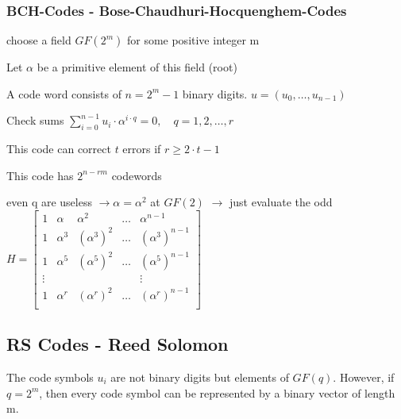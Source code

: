 \subsubsection{BCH-Codes - Bose-Chaudhuri-Hocquenghem-Codes}
\begin{liste}
  \item choose a field $GF(2^m)$ for some positive integer m
  \item Let $\alpha$ be a primitive element of this field (root)
  \item A code word consists of $n=2^m-1$ binary digits. $u=(u_0, \ldots, u_{n-1})$
  \item Check sums $\displaystyle\sum_{i=0}^{n-1} u_i \cdot \alpha^{i \cdot q} = 0, \quad q=1,2,\ldots,r$
  \item This code can correct $t$ errors if $r \geq 2\cdot t-1$
  \item This code has $2^{n-rm}$ codewords
  \item even q are useless $\to \alpha=\alpha^2$ at $GF(2)$ $\to$ just evaluate the odd\\
     			$H=\begin{bmatrix} 	1 & \alpha   & \alpha^2     	& \ldots	& \alpha^{n-1} \\    		
   						   		1 & \alpha^3 & (\alpha^3)^2	& \ldots	& (\alpha^3)^{n-1}  \\    
   						   		1 & \alpha^5 & (\alpha^5)^2	& \ldots	& (\alpha^5)^{n-1}  \\   
   						   		\vdots	&	 &					&			& \vdots \\   						 
   						   		1 & \alpha^r & (\alpha^r)^2	& \ldots	& (\alpha^r)^{n-1}  \\   		
   			\end{bmatrix}$\\
\end{liste}

\subsection{RS Codes - Reed Solomon}
The code symbols $u_i$ are not binary digits but elements of $GF(q)$. However, if $q=2^m$, then every code symbol
can be represented by a binary vector of length m.\\


